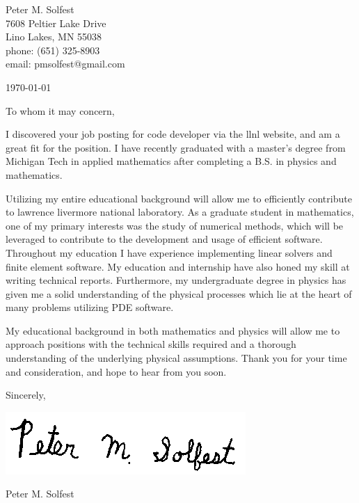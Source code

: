 \documentclass[letterpaper,12pt]{article}
\begin{document}
Peter M. Solfest\\
7608 Peltier Lake Drive\\
Lino Lakes, MN 55038\\
phone: (651) 325-8903\\
email: pmsolfest@gmail.com

\today


To whom it may concern, %

I discovered your job posting for code developer
via the llnl website,
 and am a great fit for the position.
I have recently graduated with a master's degree from Michigan Tech in applied mathematics after
completing a B.S. in physics and mathematics.

Utilizing my entire educational background will allow me to efficiently
contribute to lawrence livermore national laboratory.
As a graduate student in mathematics, one of my primary interests was the study of numerical methods,
which will be leveraged to contribute to the development and usage of efficient software.
Throughout my education I have experience implementing linear solvers and finite element software.
My education and internship have also honed my skill at writing technical reports.
Furthermore, my undergraduate degree in physics has given me a solid understanding of the
physical processes which lie at the heart of many problems utilizing PDE software.

My educational background in both mathematics and physics will allow 
me to approach positions with the technical skills required and a thorough understanding
of the underlying physical assumptions.
Thank you for your time and consideration, and hope to hear from you soon.

Sincerely,

\includegraphics[height=.5in]{signature.png}

Peter M. Solfest
\end{document}
